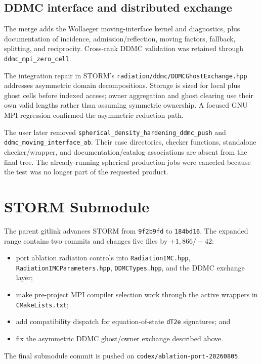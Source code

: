 \documentclass[10pt,a4paper]{article}
\newcommand{\commit}[1]{\texttt{#1}}
\newcommand{\file}[1]{\nolinkurl{#1}}
\begin{document}
\subsection{DDMC interface and distributed exchange}

The merge adds the Wollaeger moving-interface kernel and diagnostics, plus
documentation of incidence, admission/reflection, moving factors, fallback,
splitting, and reciprocity.  Cross-rank DDMC validation was retained through
\file{ddmc_mpi_zero_cell}.

The integration repair in STORM's
\file{radiation/ddmc/DDMCGhostExchange.hpp} addresses asymmetric domain
decompositions.  Storage is sized for local plus ghost cells before indexed
access; owner aggregation and ghost clearing use their own valid lengths
rather than assuming symmetric ownership.  A focused GNU MPI regression
confirmed the asymmetric reduction path.

The user later removed \file{spherical_density_hardening_ddmc_push} and
\file{ddmc_moving_interface_ab}.  Their case directories, checker functions,
standalone checker/wrapper, and documentation/catalog associations are absent
from the final tree.  The already-running spherical production jobs were
canceled because the test was no longer part of the requested product.

\section{STORM Submodule}

The parent gitlink advances STORM from \commit{9f2b9fd} to
\commit{184bd16}.  The expanded range contains two commits and changes five
files by $+1{,}866/-42$:
\begin{itemize}
  \item port ablation radiation controls into \file{RadiationIMC.hpp},
        \file{RadiationIMCParameters.hpp}, \file{DDMCTypes.hpp}, and the DDMC
        exchange layer;
  \item make pre-project MPI compiler selection work through the active
        wrappers in \file{CMakeLists.txt};
  \item add compatibility dispatch for equation-of-state \file{dT2e}
        signatures; and
  \item fix the asymmetric DDMC ghost/owner exchange described above.
\end{itemize}

The final submodule commit is pushed on
\file{codex/ablation-port-20260805}.
\end{document}
